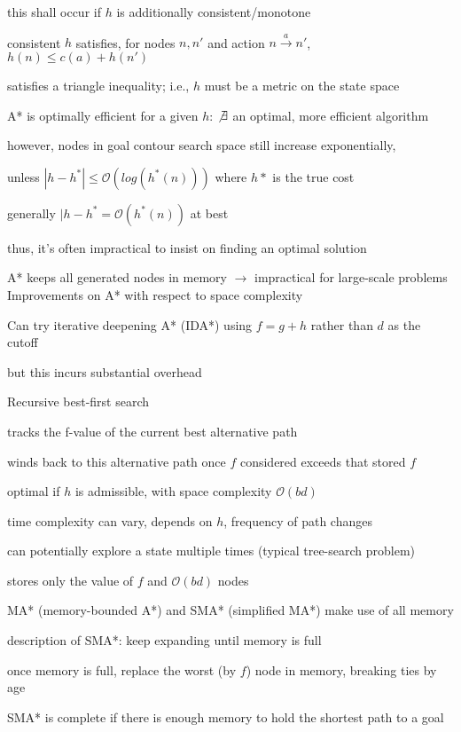 \documentclass[12pt]{article}
\begin{document}
this shall occur if $h$ is additionally consistent/monotone

consistent $h$ satisfies, for nodes $n, n'$ and action $n \xrightarrow{a} n'$, $h(n) \leq c(a) + h(n')$

satisfies a triangle inequality; i.e., $h$ must be a metric on the state space

A* is optimally efficient for a given $h$: $\not \exists$ an optimal, more efficient algorithm

however, nodes in goal contour search space still increase exponentially, 

unless $|h - h^*| \leq \mathcal{O}(log(h^*(n)))$ where $h*$ is the true cost

generally $|h - h^* = \mathcal{O}(h^*(n))$ at best

thus, it's often impractical to insist on finding an optimal solution

A* keeps all generated nodes in memory $\to$ impractical for large-scale problems\\

\noindent
Improvements on A* with respect to space complexity

\noindent
Can try iterative deepening A* (IDA*) using $f = g + h$ rather than $d$ as the cutoff

but this incurs substantial overhead

\noindent
Recursive best-first search

tracks the f-value of the current best alternative path

winds back to this alternative path once $f$ considered exceeds that stored $f$

optimal if $h$ is admissible, with space complexity $\mathcal{O}(bd)$

time complexity can vary, depends on $h$, frequency of path changes

can potentially explore a state multiple times (typical tree-search problem)

stores only the value of $f$ and $\mathcal{O}(bd)$ nodes

\noindent
MA* (memory-bounded A*) and SMA* (simplified MA*) make use of all memory

description of SMA*: keep expanding until memory is full

once memory is full, replace the worst (by $f$) node in memory, breaking ties by age

SMA* is complete if there is enough memory to hold the shortest path to a goal
\end{document}
